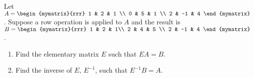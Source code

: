 \begin{enumialphparenastyle}
\begin{ex} 
Let $A = \begin{mymatrix}{rrr}
1 & 2 & 1  \\
0 & 5 & 1 \\
2 & -1 & 4
\end{mymatrix}$. Suppose a row operation is applied to $A$ and the result is $B = \begin{mymatrix}{rrr}
1 & 2 & 1\\
2 & 4 & 5 \\
2 & -1 & 4  
\end{mymatrix}$. 
\begin{enumerate}
\item Find the elementary matrix $E$ such that $EA = B$. 

\item Find the inverse of $E$, $E^{-1}$, such that $E^{-1}B = A$.
\end{enumerate}
\end{ex}

\end{enumialphparenastyle}